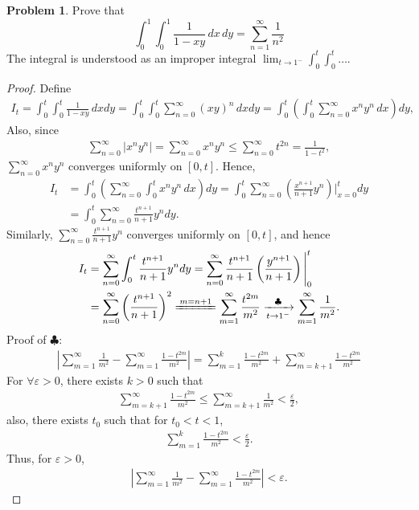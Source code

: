 \documentclass[11pt]{article}
\theoremstyle{definition}
\newtheorem{problem}{Problem}
\theoremstyle{definition}
\begin{document}
\begin{problem}
Prove that
$$
\int_0^1\int_0^1 \frac{1}{1-xy}\, dx\, dy =\sum_{n=1}^\infty \frac{1}{n^2}
$$
The integral is understood as an improper integral
$\displaystyle\lim_{t\to 1^-} \int_0^t\int_0^t\ldots$.
\end{problem}
\begin{proof}
Define
\begin{align*}
    I_t = \int^t_0 \int^t_0 \frac{1}{1 - xy}\, dx dy = \int^t_0 \int^t_0 \sum^\infty_{n=0} (xy)^n \, dx dy = \int^t_0 \left(\int^t_0 \sum^\infty_{n=0} x^n y^n \, dx \right)dy,
\end{align*}
Also, since
\begin{align*}
    \sum^\infty_{n=0} \left|x^n y^n \right| = \sum^\infty_{n=0} x^n y^n \leq \sum^\infty_{n=0} t^{2n} = \frac{1}{1 - t^2},
\end{align*}
$\sum^\infty_{n=0} x^n y^n$ converges uniformly on $[0,t]$. Hence, 
\begin{align*}
    I_t & = \int^t_0 \left(\sum^\infty_{n=0} \int^t_0 x^ny^n \, dx \right)dy = \int^t_0 \sum^\infty_{n=0} \left(\frac{x^{n+1}}{n+1}y^n \right)\Bigg|^t_{x=0} dy \\
    & = \int^t_0 \sum^\infty_{n=0} \frac{t^{n+1}}{n+1}y^n dy.
\end{align*}
Similarly, $\sum^\infty_{n=0} \frac{t^{n+1}}{n+1}y^n$ converges uniformly on $[0,t]$, and hence
\begin{align*}
    I_t & = \sum^\infty_{n=0} \int^t_0 \frac{t^{n+1}}{n+1}y^n dy = \sum^\infty_{n=0} \frac{t^{n+1}}{n+1} \left(\frac{y^{n+1}}{n+1}\right)\Bigg|^t_0 \\
    & = \sum^\infty_{n=0} \left(\frac{t^{n+1}}{n+1}\right)^2 \xlongequal{m=n+1} \sum^\infty_{m=1}\frac{t^{2m}}{m^2} \xrightarrow[t\to 1^-]{\clubsuit} \sum^\infty_{m=1} \frac{1}{m^2}.
\end{align*}
Proof of $\clubsuit$:
\begin{align*}
    \left| \sum^\infty_{m=1} \frac{1}{m^2} - \sum^\infty_{m=1} \frac{1-t^{2m}}{m^2} \right| = \sum^k_{m=1} \frac{1 - t^{2m}}{m^2} + \sum^\infty_{m=k+1} \frac{1 - t^{2m}}{m^2}
\end{align*}
For $\forall \varepsilon > 0$, there exists $k > 0$ such that \begin{align*}
    \sum^\infty_{m=k+1} \frac{1 - t^{2m}}{m^2} \leq \sum^\infty_{m=k+1} \frac{1}{m^2} < \frac{\varepsilon}{2},
\end{align*}
also, there exists $t_0$ such that for $t_0 < t < 1$, 
\begin{align*}
    \sum^k_{m=1} \frac{1 - t^{2m}}{m^2} < \frac{\varepsilon}{2}.
\end{align*}
Thus, for $\varepsilon > 0$, 
\begin{align*}
    \left| \sum^\infty_{m=1} \frac{1}{m^2} - \sum^\infty_{m=1} \frac{1-t^{2m}}{m^2} \right| < \varepsilon.
\end{align*}
\end{proof}
\end{document}
